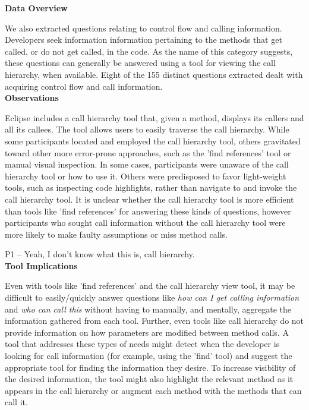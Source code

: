 \documentclass[conference]{IEEEtran}
\begin{document}
\noindent\textbf{Data Overview}

We also extracted questions relating to control flow and calling information. 
Developers seek information information pertaining to the methods that get called, or do not get called, in the code. 
As the name of this category suggests, these questions can generally be answered using a tool for viewing the call hierarchy, when available. 
Eight of the 155 distinct questions extracted dealt with acquiring control flow and call information.
\\

\noindent\textbf{Observations}

Eclipse includes a call hierarchy tool that, given a method, displays its callers and all its callees. 
The tool allows users to easily traverse the call hierarchy. 
While some participants located and employed the call hierarchy tool, others gravitated toward other more error-prone approaches, such as the 'find references' tool or manual visual inspection. 
In some cases, participants were unaware of the call hierarchy tool or how to use it. 
Others were predisposed to favor light-weight tools, such as inspecting code highlights, rather than navigate to and invoke the call hierarchy tool.
It is unclear whether the call hierarchy tool is more efficient than tools like 'find references' for answering these kinds of questions, however participants who sought call information without the call hierarchy tool were more likely to make faulty assumptions or miss method calls. 

P1 -- Yeah, I don't know what this is, call hierarchy.
\\

\noindent\textbf{Tool Implications}

Even with tools like 'find references' and the call hierarchy view tool, it may be difficult to easily/quickly answer questions like \emph{how can I get calling information} and \emph{who can call this} without having to manually, and mentally, aggregate the information gathered from each tool. 
Further, even tools like call hierarchy do not provide information on how parameters are modified between method calls. 
A tool that addresses these types of needs might detect when the developer is looking for call information (for example, using the 'find' tool) and suggest the appropriate tool for finding the information they desire. 
To increase visibility of the desired information, the tool might also highlight the relevant method as it appears in the call hierarchy or augment each method with the methods that can call it.
\end{document}
